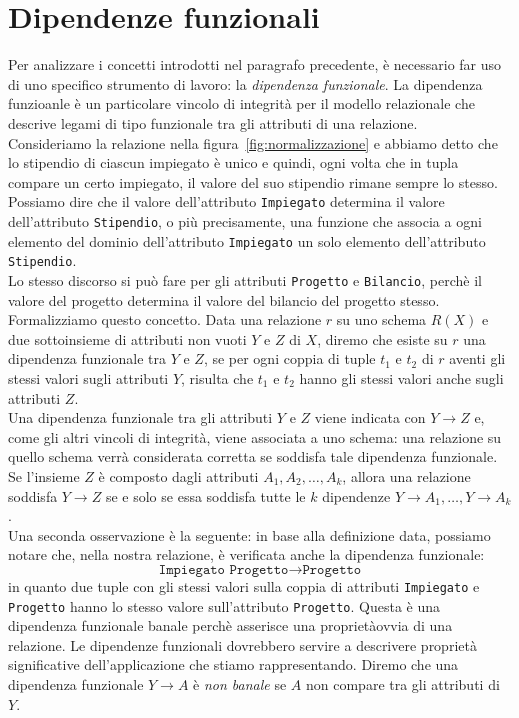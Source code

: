 \documentclass[12pt]{report}
\begin{document}
	\section{Dipendenze funzionali}
	Per analizzare i concetti introdotti nel paragrafo precedente, è necessario far uso di uno specifico strumento di lavoro: la \textit{dipendenza funzionale}. La dipendenza funzioanle è un particolare vincolo di integrità per il modello relazionale che descrive legami di tipo funzionale tra gli attributi di una relazione. \\
	Consideriamo la relazione nella figura~\ref{fig:normalizzazione} e abbiamo detto che lo stipendio di ciascun impiegato è unico e quindi, ogni volta che in tupla compare un certo impiegato, il valore del suo stipendio rimane sempre lo stesso. Possiamo dire che il valore dell'attributo \texttt{Impiegato} determina il valore dell'attributo \texttt{Stipendio}, o più precisamente, una funzione che associa a ogni elemento del dominio dell'attributo \texttt{Impiegato} un solo elemento dell'attributo \texttt{Stipendio}. \\
	Lo stesso discorso si può fare per gli attributi \texttt{Progetto} e \texttt{Bilancio}, perchè il valore del progetto determina il valore del bilancio del progetto stesso. \\
	Formalizziamo questo concetto. Data una relazione $r$ su uno schema $R\left(X\right)$ e due sottoinsieme di attributi non vuoti $Y$ e $Z$ di $X$, diremo che esiste su $r$ una dipendenza funzionale tra $Y$ e $Z$, se per ogni coppia di tuple $t_1$ e $t_2$ di $r$ aventi gli stessi valori sugli attributi $Y$, risulta che $t_1$ e $t_2$ hanno gli stessi valori anche sugli attributi $Z$. \\
	Una dipendenza funzionale tra gli attributi $Y$ e $Z$ viene indicata con $Y \to Z$ e, come gli altri vincoli di integrità, viene associata a uno schema: una relazione su quello schema verrà considerata corretta se soddisfa tale dipendenza funzionale. \\
	Se l'insieme $Z$ è composto dagli attributi $A_1, A_2, \dots, A_k$, allora una relazione soddisfa $Y \to Z$ se e solo se essa soddisfa tutte le $k$ dipendenze $Y \to A_1, \dots, Y \to A_k$. \\
	Una seconda osservazione è la seguente: in base alla definizione data, possiamo notare che, nella nostra relazione, è verificata anche la dipendenza funzionale:
	\[
	\texttt{Impiegato Progetto} \to \texttt{Progetto}
	\]
	in quanto due tuple con gli stessi valori sulla coppia di attributi \texttt{Impiegato} e \texttt{Progetto} hanno lo stesso valore sull'attributo \texttt{Progetto}. Questa è una dipendenza funzionale banale perchè asserisce una proprietàovvia di una relazione. Le dipendenze funzionali dovrebbero servire a descrivere proprietà significative dell'applicazione che stiamo rappresentando. Diremo che una dipendenza funzionale $Y \to A$ è \textit{non banale} se $A$ non compare tra gli attributi di $Y$. \\
\end{document}
